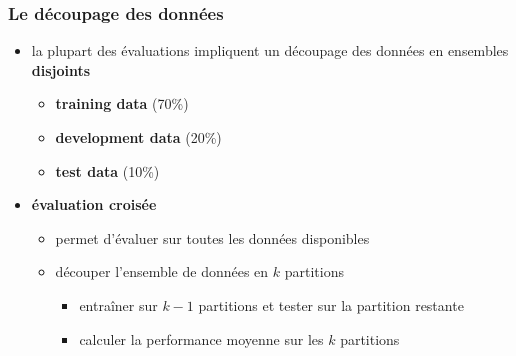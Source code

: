 \begin{frame}
\frametitle{Le découpage des données}

\begin{itemize} \itemsep0.8em
    \item la plupart des évaluations impliquent un découpage des données en 
          ensembles \textbf{disjoints}
    \begin{itemize}
        \item \textbf{training data} (70\%)
        \item \textbf{development data} (20\%)
        \item \textbf{test data} (10\%)
    \end{itemize}

    \item \textbf{évaluation croisée}
    \begin{itemize}
        \item permet d'évaluer sur toutes les données disponibles
        \item découper l'ensemble de données en $k$ partitions
        \begin{itemize}
            \item entraîner sur $k-1$ partitions et tester sur la partition restante
            \item calculer la performance moyenne sur les $k$ partitions
        \end{itemize}
    \end{itemize}
\end{itemize}


\end{frame}


